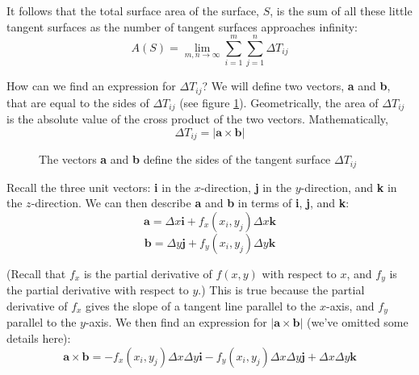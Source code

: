 It follows that the total surface area of the surface, $S$, is the sum of all 
these little tangent surfaces as the number of tangent surfaces approaches 
infinity:
$$A(S) = \lim_{m, n \to \infty} \sum_{i = 1}^m \sum_{j = 1}^n \Delta T_{ij}$$

How can we find an expression for $\Delta T_{ij}$? We will define two vectors, 
\textbf{a} and \textbf{b}, that are equal to the sides of $\Delta T_{ij}$ (see 
figure \ref{fig:vectors}). Geometrically, the area of $\Delta T_{ij}$ is the 
absolute value of the cross product of the two vectors. Mathematically, 
$$\Delta T_{ij} = |\textbf{a} \times \textbf{b}|$$

\begin{figure}[htbp]
    \centering
    \caption{The vectors \textbf{a} and \textbf{b} define the sides of the 
    tangent surface $\Delta T_{ij}$}
    \label{fig:vectors}
\end{figure}

Recall the three unit vectors: \textbf{i} in the $x$-direction, \textbf{j} in 
the $y$-direction, and \textbf{k} in the $z$-direction. We can then describe 
\textbf{a} and \textbf{b} in terms of \textbf{i}, \textbf{j}, and \textbf{k}:
$$\textbf{a} = \Delta x \textbf{i} + f_x(x_i, y_j) \Delta x \textbf{k}$$
$$\textbf{b} = \Delta y \textbf{j} + f_y(x_i, y_j) \Delta y \textbf{k}$$

(Recall that $f_x$ is the partial derivative of $f(x, y)$ with respect to $x$, 
and $f_y$ is the partial derivative with respect to $y$.) This is true because 
the partial derivative of $f_x$ gives the slope of a tangent line parallel to 
the $x$-axis, and $f_y$ parallel to the $y$-axis. We then find an expression 
for $| \textbf{a} \times \textbf{b} |$ (we've omitted some details here):
$$\textbf{a} \times \textbf{b} = -f_x(x_i, y_j) \Delta x \Delta y \textbf{i} - 
f_y(x_i, y_j) \Delta x \Delta y \textbf{j} + \Delta x \Delta y \textbf{k}$$

